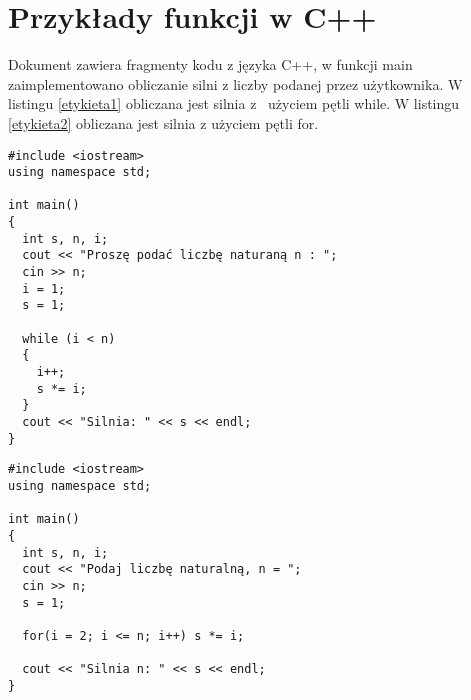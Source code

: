 \documentclass[a4paper,12pt]{book}
\begin{document}
\section*{Przykłady funkcji w C++}

Dokument zawiera fragmenty kodu z języka C++, w funkcji main zaimplementowano obliczanie silni z liczby podanej przez użytkownika. W listingu \ref{etykieta1} obliczana jest silnia z~ użyciem pętli while. 
W listingu \ref{etykieta2} obliczana jest silnia z użyciem pętli for. 

\begin{lstlisting}[caption=Obliczanie silni w while, captionpos=t, label=src:sqrt, frame=lbtr, frameround=ffff, captionpos=b, label=etykieta1]
#include <iostream>
using namespace std;

int main()
{
  int s, n, i;
  cout << "Proszę podać liczbę naturaną n : ";
  cin >> n;
  i = 1;
  s = 1;
  
  while (i < n)
  {
    i++;
    s *= i;
  }
  cout << "Silnia: " << s << endl;
}
\end{lstlisting}

\begin{lstlisting}[caption=Obliczanie silni w for, captionpos=t, label=src:sqrt, frame=lbtr, frameround=ffff, captionpos=b, label=etykieta2]
#include <iostream>
using namespace std;

int main()
{
  int s, n, i;  
  cout << "Podaj liczbę naturalną, n = ";
  cin >> n;
  s = 1;  
  
  for(i = 2; i <= n; i++) s *= i;  
  
  cout << "Silnia n: " << s << endl;
}
\end{lstlisting}
\end{document}
